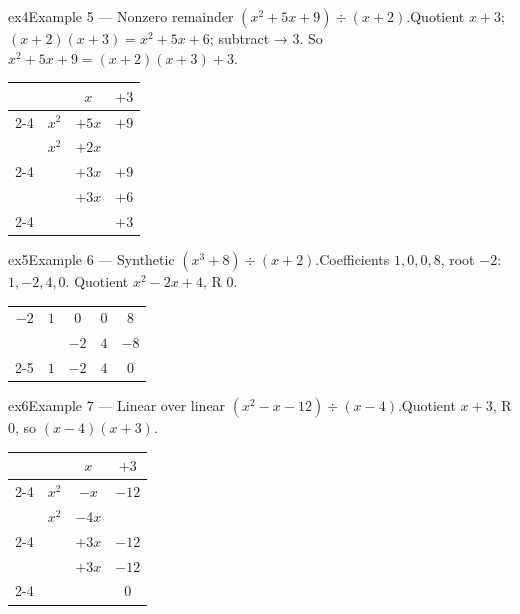 \documentclass[11pt]{article}
\begin{document}
\begin{example}{ex4}{Example 5 --- Nonzero remainder}
$(x^2+5x+9)\div(x+2)$.\soln Quotient $x+3$; $(x+2)(x+3)=x^2+5x+6$; subtract → $3$. So $x^2+5x+9=(x+2)(x+3)+3$.\begin{center}\renewcommand{\arraystretch}{1.2}\begin{tabular}{cccc}
&  & $x$ & $+3$ \\
\cline{2-4}
\multicolumn{1}{r|}{$x+2$} & $x^2$ & $+5x$ & $+9$ \\
\multicolumn{1}{r|}{} & $x^2$ & $+2x$ &  \\
\cline{2-4}
\multicolumn{1}{r|}{} &  & $+3x$ & $+9$ \\
\multicolumn{1}{r|}{} &  & $+3x$ & $+6$ \\
\cline{2-4}
\multicolumn{1}{r|}{} &  &  & $+3$ \\
\end{tabular}\end{center}
\end{example}

\begin{example}{ex5}{Example 6 --- Synthetic}
$(x^3+8)\div(x+2)$.\soln Coefficients $1,0,0,8$, root $-2$: $1,-2,4,0$. Quotient $x^2-2x+4$, R $0$.\begin{center}\renewcommand{\arraystretch}{1.2}\begin{tabular}{ccccc}
\multicolumn{1}{r|}{$-2$} & $1$ & $0$ & $0$ & $8$ \\
\multicolumn{1}{r|}{} &  & $-2$ & $4$ & $-8$ \\
\cline{2-5}
\multicolumn{1}{r|}{} & $1$ & $-2$ & $4$ & $0$ \\
\end{tabular}\end{center}
\end{example}

\begin{example}{ex6}{Example 7 --- Linear over linear}
$(x^2-x-12)\div(x-4)$.\soln Quotient $x+3$, R $0$, so $(x-4)(x+3)$.\begin{center}\renewcommand{\arraystretch}{1.2}\begin{tabular}{cccc}
&  & $x$ & $+3$ \\
\cline{2-4}
\multicolumn{1}{r|}{$x-4$} & $x^2$ & $-x$ & $-12$ \\
\multicolumn{1}{r|}{} & $x^2$ & $-4x$ &  \\
\cline{2-4}
\multicolumn{1}{r|}{} &  & $+3x$ & $-12$ \\
\multicolumn{1}{r|}{} &  & $+3x$ & $-12$ \\
\cline{2-4}
\multicolumn{1}{r|}{} &  &  & $0$ \\
\end{tabular}\end{center}
\end{example}
\end{document}
